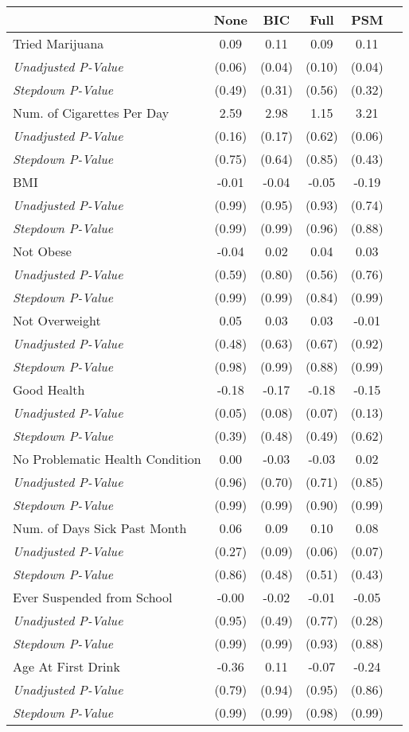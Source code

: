 \begin{tabular}{l c c c c c}
\toprule
 & None & BIC & Full & PSM \\
\midrule
Tried Marijuana & 0.09 & 0.11 & 0.09 & 0.11 \\
\quad \textit{Unadjusted P-Value} & (0.06) & (0.04) & (0.10) & (0.04) \\
\quad \textit{Stepdown P-Value} & (0.49) & (0.31) & (0.56) & (0.32) \\
Num. of Cigarettes Per Day & 2.59 & 2.98 & 1.15 & 3.21 \\
\quad \textit{Unadjusted P-Value} & (0.16) & (0.17) & (0.62) & (0.06) \\
\quad \textit{Stepdown P-Value} & (0.75) & (0.64) & (0.85) & (0.43) \\
BMI & -0.01 & -0.04 & -0.05 & -0.19 \\
\quad \textit{Unadjusted P-Value} & (0.99) & (0.95) & (0.93) & (0.74) \\
\quad \textit{Stepdown P-Value} & (0.99) & (0.99) & (0.96) & (0.88) \\
Not Obese & -0.04 & 0.02 & 0.04 & 0.03 \\
\quad \textit{Unadjusted P-Value} & (0.59) & (0.80) & (0.56) & (0.76) \\
\quad \textit{Stepdown P-Value} & (0.99) & (0.99) & (0.84) & (0.99) \\
Not Overweight & 0.05 & 0.03 & 0.03 & -0.01 \\
\quad \textit{Unadjusted P-Value} & (0.48) & (0.63) & (0.67) & (0.92) \\
\quad \textit{Stepdown P-Value} & (0.98) & (0.99) & (0.88) & (0.99) \\
Good Health & -0.18 & -0.17 & -0.18 & -0.15 \\
\quad \textit{Unadjusted P-Value} & (0.05) & (0.08) & (0.07) & (0.13) \\
\quad \textit{Stepdown P-Value} & (0.39) & (0.48) & (0.49) & (0.62) \\
No Problematic Health Condition & 0.00 & -0.03 & -0.03 & 0.02 \\
\quad \textit{Unadjusted P-Value} & (0.96) & (0.70) & (0.71) & (0.85) \\
\quad \textit{Stepdown P-Value} & (0.99) & (0.99) & (0.90) & (0.99) \\
Num. of Days Sick Past Month & 0.06 & 0.09 & 0.10 & 0.08 \\
\quad \textit{Unadjusted P-Value} & (0.27) & (0.09) & (0.06) & (0.07) \\
\quad \textit{Stepdown P-Value} & (0.86) & (0.48) & (0.51) & (0.43) \\
Ever Suspended from School & -0.00 & -0.02 & -0.01 & -0.05 \\
\quad \textit{Unadjusted P-Value} & (0.95) & (0.49) & (0.77) & (0.28) \\
\quad \textit{Stepdown P-Value} & (0.99) & (0.99) & (0.93) & (0.88) \\
Age At First Drink & -0.36 & 0.11 & -0.07 & -0.24 \\
\quad \textit{Unadjusted P-Value} & (0.79) & (0.94) & (0.95) & (0.86) \\
\quad \textit{Stepdown P-Value} & (0.99) & (0.99) & (0.98) & (0.99) \\
\bottomrule
\end{tabular}
